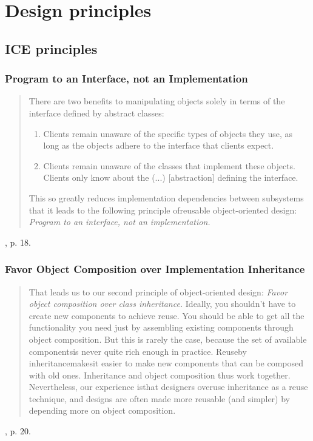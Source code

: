 \chapter{Design principles}

\section{ICE principles}

\subsection{Program to an Interface, not an Implementation}

\blockquote{
There are two benefits to manipulating objects solely in terms of the interface defined
by abstract classes:
\begin{enumerate}
    \item Clients remain unaware of the specific types of objects they use, 
    as long as the objects adhere to the interface that clients expect.
    \item Clients remain unaware of the classes that implement these objects.
    Clients only know about the (...) [abstraction] defining the interface.
\end{enumerate}
\newline\newline
This so greatly reduces implementation dependencies between subsystems that it leads
to the following principle ofreusable object-oriented design:
\newline\newline
\textit{Program to an interface, not an implementation.}
}{\cite{Gof1994}, p. 18.}

\subsection{Favor Object Composition over Implementation Inheritance}
\blockquote{That leads us to our second principle of object-oriented design:
\newline\newline
\textit{Favor object composition over class inheritance.}
\newline\newline
Ideally, you shouldn't have to create new components to achieve reuse. You should
be able to get all the functionality you need just by assembling existing components
through object composition. But this is rarely the case, because the set of available
componentsis never quite rich enough in practice. Reuseby inheritancemakesit easier
to make new components that can be composed with old ones. Inheritance and object
composition thus work together.
\newline\newline
Nevertheless, our experience isthat designers overuse inheritance as a reuse technique,
and designs are often made more reusable (and simpler) by depending more on object composition.}
{\cite{Gof1994}, p. 20.}


